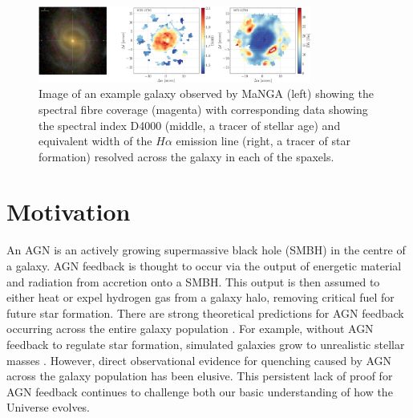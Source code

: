 \documentclass[11pt]{article}
\begin{document}
\vspace{-0.5em}

\begin{figure}[h]
\begin{centering}
\includegraphics[width=0.8\textwidth]{image_halpha_vel_map_8078-12703_gal_aligned_ifu_bundles-MAPS-VOR10-GAU-MILESHC.pdf}
\vspace{-0.5em}
\caption[8pt]{Image of an example galaxy observed by MaNGA (left) showing the spectral fibre coverage (magenta) with corresponding data showing the spectral index D4000 (middle, a tracer of stellar age) and equivalent width of the $H\alpha$ emission line (right, a tracer of star formation) resolved across the galaxy in each of the spaxels.}
\label{gal}
\end{centering}
\vspace{-1.5em}
\end{figure}
\vspace{-0.5em}

\section*{\large Motivation}
\vspace{-0.5em}

\indent An AGN is an actively growing supermassive black hole (SMBH) in the centre of a galaxy. %
AGN feedback is thought to occur via the output of energetic material and radiation from accretion onto a SMBH. This output is then assumed to either heat or expel hydrogen gas from a galaxy halo, removing critical fuel for future star formation. There are strong theoretical predictions for AGN feedback occurring across the entire galaxy population \citep{Fabian12, Gaibler12}. For example, without AGN feedback to regulate star formation, simulated galaxies grow to unrealistic stellar masses \citep[e.g.][]{silk12}. However, direct observational evidence for quenching caused by AGN across the galaxy population has been elusive. This persistent lack of proof for AGN feedback continues to challenge both our basic understanding of how the Universe evolves. 
\end{document}

